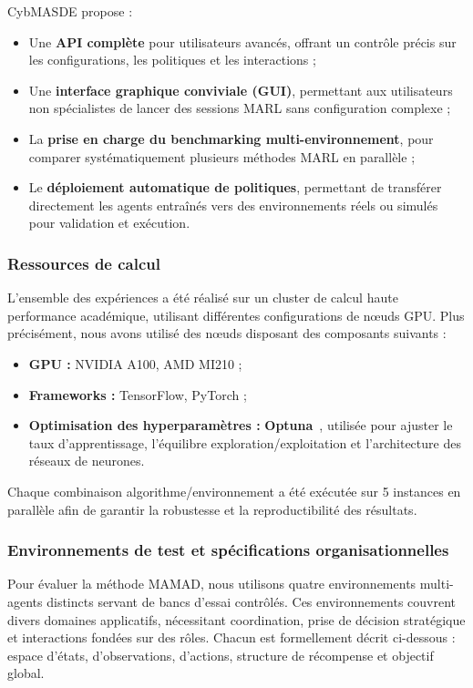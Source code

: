 CybMASDE propose :
\begin{itemize}
    \item Une \textbf{API complète} pour utilisateurs avancés, offrant un contrôle précis sur les configurations, les politiques et les interactions ;
    \item Une \textbf{interface graphique conviviale (GUI)}, permettant aux utilisateurs non spécialistes de lancer des sessions MARL sans configuration complexe ;
    \item La \textbf{prise en charge du benchmarking multi-environnement}, pour comparer systématiquement plusieurs méthodes MARL en parallèle ;
    \item Le \textbf{déploiement automatique de politiques}, permettant de transférer directement les agents entraînés vers des environnements réels ou simulés pour validation et exécution.
\end{itemize}



\subsubsection{Ressources de calcul}

L'ensemble des expériences a été réalisé sur un cluster de calcul haute performance académique, utilisant différentes configurations de nœuds GPU. Plus précisément, nous avons utilisé des nœuds disposant des composants suivants :
\begin{itemize}
    \item \textbf{GPU :} NVIDIA A100, AMD MI210 ;
    \item \textbf{Frameworks :} TensorFlow, PyTorch ;
    \item \textbf{Optimisation des hyperparamètres :} \textbf{Optuna}~\cite{akiba2019optuna}, utilisée pour ajuster le taux d'apprentissage, l'équilibre exploration/exploitation et l'architecture des réseaux de neurones.
\end{itemize}

Chaque combinaison algorithme/environnement a été exécutée sur 5 instances en parallèle afin de garantir la robustesse et la reproductibilité des résultats.

\subsubsection{Environnements de test et spécifications organisationnelles}

Pour évaluer la méthode MAMAD, nous utilisons quatre environnements multi-agents distincts servant de bancs d'essai contrôlés. Ces environnements couvrent divers domaines applicatifs, nécessitant coordination, prise de décision stratégique et interactions fondées sur des rôles. Chacun est formellement décrit ci-dessous : espace d'états, d'observations, d'actions, structure de récompense et objectif global.


